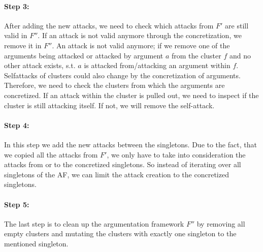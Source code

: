 \paragraph{Step 3:} After adding the new attacks, we need to check which attacks from $F'$ are still valid in $F''$. If an attack is not valid
anymore through the concretization, we remove it in $F''$. An attack is not valid anymore; if we remove one of the arguments being attacked or attacked by argument $a$ from the cluster $f$ and no other attack exists, s.t. $a$ is attacked from/attacking an argument within $f$. Selfattacks of clusters could also change by the concretization of arguments. Therefore, we need to check the clusters from which the arguments are concretized. If an attack within the cluster is pulled out, we need to inspect if the cluster is still attacking itself. If not, we will remove the self-attack.

\paragraph{Step 4:} In this step we add the new attacks between the singletons. Due to the fact, that we copied all the attacks from $F'$, we only have to take into consideration the attacks from or to the concretized singletons. So instead of iterating over all singletons of the AF, we can limit the attack creation to the concretized singletons. 

\paragraph{Step 5:} The last step is to clean up the argumentation framework $F''$ by removing all empty clusters and mutating the clusters with exactly
one singleton to the mentioned singleton. 



